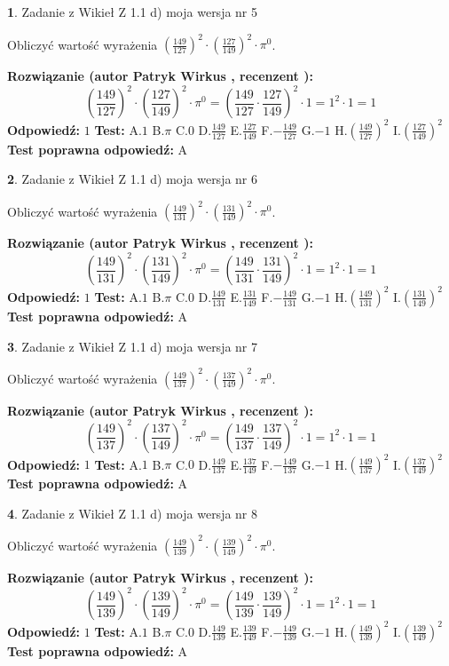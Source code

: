 \documentclass[12pt, a4paper]{article}
\theoremstyle{definition} %
\newtheorem{zad}{}
\newcommand{\zadStart}[1]{\begin{zad}#1\newline}
\newcommand{\zadStop}{\end{zad}}
\newcommand{\rozwStart}[2]{\noindent \textbf{Rozwiązanie (autor #1 , recenzent #2): }\newline}
\newcommand{\rozwStop}{\newline}
\newcommand{\odpStart}{\noindent \textbf{Odpowiedź:}\newline}
\newcommand{\odpStop}{\newline}
\newcommand{\testStart}{\noindent \textbf{Test:}\newline}
\newcommand{\testStop}{\newline}
\newcommand{\kluczStart}{\noindent \textbf{Test poprawna odpowiedź:}\newline}
\newcommand{\kluczStop}{\newline}
\begin{document}
\zadStart{Zadanie z Wikieł Z 1.1 d) moja wersja nr 5}

Obliczyć wartość wyrażenia $(\frac{149}{127})^{2} \cdot (\frac{127}{149})^{2} \cdot \pi^{0}$.
\zadStop
\rozwStart{Patryk Wirkus}{}
$$(\frac{149}{127})^{2} \cdot (\frac{127}{149})^{2} \cdot \pi^{0} = (\frac{149}{127} \cdot \frac{127}{149})^{2} \cdot 1 = 1^{2} \cdot 1 = 1$$
\rozwStop
\odpStart
$1$
\odpStop
\testStart
A.$1$ B.$\pi$ C.$0$ D.$\frac{149}{127}$ E.$\frac{127}{149}$
F.$-\frac{149}{127}$ G.$-1$
H.$(\frac{149}{127})^{2}$
I.$(\frac{127}{149})^{2}$
\testStop
\kluczStart
A
\kluczStop



\zadStart{Zadanie z Wikieł Z 1.1 d) moja wersja nr 6}

Obliczyć wartość wyrażenia $(\frac{149}{131})^{2} \cdot (\frac{131}{149})^{2} \cdot \pi^{0}$.
\zadStop
\rozwStart{Patryk Wirkus}{}
$$(\frac{149}{131})^{2} \cdot (\frac{131}{149})^{2} \cdot \pi^{0} = (\frac{149}{131} \cdot \frac{131}{149})^{2} \cdot 1 = 1^{2} \cdot 1 = 1$$
\rozwStop
\odpStart
$1$
\odpStop
\testStart
A.$1$ B.$\pi$ C.$0$ D.$\frac{149}{131}$ E.$\frac{131}{149}$
F.$-\frac{149}{131}$ G.$-1$
H.$(\frac{149}{131})^{2}$
I.$(\frac{131}{149})^{2}$
\testStop
\kluczStart
A
\kluczStop



\zadStart{Zadanie z Wikieł Z 1.1 d) moja wersja nr 7}

Obliczyć wartość wyrażenia $(\frac{149}{137})^{2} \cdot (\frac{137}{149})^{2} \cdot \pi^{0}$.
\zadStop
\rozwStart{Patryk Wirkus}{}
$$(\frac{149}{137})^{2} \cdot (\frac{137}{149})^{2} \cdot \pi^{0} = (\frac{149}{137} \cdot \frac{137}{149})^{2} \cdot 1 = 1^{2} \cdot 1 = 1$$
\rozwStop
\odpStart
$1$
\odpStop
\testStart
A.$1$ B.$\pi$ C.$0$ D.$\frac{149}{137}$ E.$\frac{137}{149}$
F.$-\frac{149}{137}$ G.$-1$
H.$(\frac{149}{137})^{2}$
I.$(\frac{137}{149})^{2}$
\testStop
\kluczStart
A
\kluczStop



\zadStart{Zadanie z Wikieł Z 1.1 d) moja wersja nr 8}

Obliczyć wartość wyrażenia $(\frac{149}{139})^{2} \cdot (\frac{139}{149})^{2} \cdot \pi^{0}$.
\zadStop
\rozwStart{Patryk Wirkus}{}
$$(\frac{149}{139})^{2} \cdot (\frac{139}{149})^{2} \cdot \pi^{0} = (\frac{149}{139} \cdot \frac{139}{149})^{2} \cdot 1 = 1^{2} \cdot 1 = 1$$
\rozwStop
\odpStart
$1$
\odpStop
\testStart
A.$1$ B.$\pi$ C.$0$ D.$\frac{149}{139}$ E.$\frac{139}{149}$
F.$-\frac{149}{139}$ G.$-1$
H.$(\frac{149}{139})^{2}$
I.$(\frac{139}{149})^{2}$
\testStop
\kluczStart
A
\kluczStop
\end{document}
